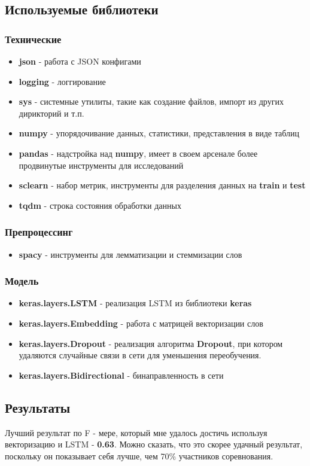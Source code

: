 \subsection{Используемые библиотеки}

\subsubsection{Технические}

\begin{itemize}
    \item \textbf{json} - работа с JSON конфигами
    \item \textbf{logging} - логгирование
    \item \textbf{sys} - системные утилиты, такие как создание файлов, импорт из других дирикторий и т.п.
    \item \textbf{numpy} - упорядочивание данных, статистики, представления в виде таблиц
    \item \textbf{pandas} - надстройка над \textbf{numpy}, имеет в своем арсенале более продвинутые инструменты для исследований
    \item \textbf{sclearn} - набор метрик, инструменты для разделения данных на \textbf{train} и \textbf{test}
    \item \textbf{tqdm} - строка состояния обработки данных
\end{itemize}

\subsubsection{Препроцессинг}
\begin{itemize}
    \item \textbf{spacy} - инструменты для лемматизации и стеммизации слов
\end{itemize}


\subsubsection{Модель}
\begin{itemize}
    \item \textbf{keras.layers.LSTM} - реализация LSTM из библиотеки \textbf{keras}
    \item \textbf{keras.layers.Embedding} - работа с матрицей векторизации слов
    \item \textbf{keras.layers.Dropout} - реализация алгоритма \textbf{Dropout}, при котором удаляются случайные связи в сети для уменьшения переобучения.
    \item \textbf{keras.layers.Bidirectional} - бинаправленность в сети
\end{itemize}


\subsection{Результаты}

Лучший результат по F - мере, который мне удалось достичь используя векторизацию и LSTM - \textbf{0.63}. Можно сказать, что это скорее удачный результат, поскольку он показывает себя лучше, чем 70\% участников соревнования. 





